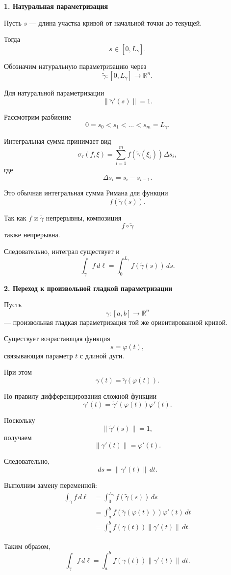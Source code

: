 \documentclass[12pt,a4paper]{article}
\begin{document}
\begin{proofbox}

\textbf{1. Натуральная параметризация}

Пусть $s$ — длина участка кривой от начальной точки до текущей.

Тогда
\[
s\in[0,L_\gamma].
\]

Обозначим натуральную параметризацию через
\[
\widetilde{\gamma}:
[0,L_\gamma]\to\mathbb{R}^n.
\]

Для натуральной параметризации
\[
\|\widetilde{\gamma}'(s)\|=1.
\]

Рассмотрим разбиение
\[
0=s_0<s_1<\dots<s_m=L_\gamma.
\]

Интегральная сумма принимает вид
\[
\sigma_\tau(f,\xi)
=
\sum_{i=1}^{m}
f(\widetilde{\gamma}(\xi_i))\Delta s_i,
\]
где
\[
\Delta s_i=s_i-s_{i-1}.
\]

Это обычная интегральная сумма Римана для функции
\[
f(\widetilde{\gamma}(s)).
\]

Так как $f$ и $\widetilde{\gamma}$ непрерывны, композиция
\[
f\circ\widetilde{\gamma}
\]
также непрерывна.

Следовательно, интеграл существует и
\[
\int_\gamma f\,d\ell
=
\int_0^{L_\gamma}
f(\widetilde{\gamma}(s))\,ds.
\]

\textbf{2. Переход к произвольной гладкой параметризации}

Пусть
\[
\gamma:[a,b]\to\mathbb{R}^n
\]
— произвольная гладкая параметризация той же ориентированной кривой.

Существует возрастающая функция
\[
s=\varphi(t),
\]
связывающая параметр $t$ с длиной дуги.

При этом
\[
\gamma(t)=\widetilde{\gamma}(\varphi(t)).
\]

По правилу дифференцирования сложной функции
\[
\gamma'(t)
=
\widetilde{\gamma}'(\varphi(t))\varphi'(t).
\]

Поскольку
\[
\|\widetilde{\gamma}'(s)\|=1,
\]
получаем
\[
\|\gamma'(t)\|=\varphi'(t).
\]

Следовательно,
\[
ds=\|\gamma'(t)\|\,dt.
\]

Выполним замену переменной:
\[
\begin{aligned}
\int_\gamma f\,d\ell
&=
\int_0^{L_\gamma}
f(\widetilde{\gamma}(s))\,ds\\
&=
\int_a^b
f(\widetilde{\gamma}(\varphi(t)))
\varphi'(t)\,dt\\
&=
\int_a^b
f(\gamma(t))\|\gamma'(t)\|\,dt.
\end{aligned}
\]

Таким образом,
\[
\boxed{
\int_\gamma f\,d\ell
=
\int_a^b f(\gamma(t))\|\gamma'(t)\|\,dt.
}
\]
\end{proofbox}
\end{document}
